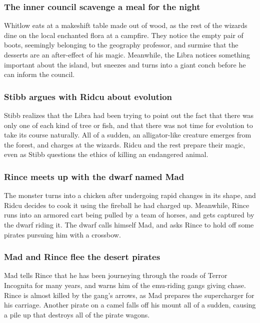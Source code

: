 \subsubsection{The inner council scavenge a meal for the night}
\Gls{Whitlow} eats at a makeshift table made out of wood, as the rest of the wizards dine on the
local enchanted flora at a campfire. They notice the empty pair of boots, seemingly belonging to
the geography professor, and surmise that the desserts are an after-effect of his magic. Meanwhile,
the \Gls{Libra} notices something important about the island, but sneezes and turns into a giant
conch before he can inform the council.

\subsubsection{\Gls{Stibb} argues with \Gls{Ridcu} about evolution}
\Gls{Stibb} realizes that the \Gls{Libra} had been trying to point out the fact that there was
only one of each kind of tree or fish, and that there was not time for evolution to take its course
naturally. All of a sudden, an alligator-like creature emerges from the forest, and charges at the
wizards. \Gls{Ridcu} and the rest prepare their magic, even as \Gls{Stibb} questions the ethics of
killing an endangered animal.

\subsubsection{\Gls{Rince} meets up with the dwarf named \Gls{Mad}}
The monster turns into a chicken after undergoing rapid changes in its shape, and \Gls{Ridcu}
decides to cook it using the fireball he had charged up. Meanwhile, \Gls{Rince} runs into an armored
cart being pulled by a team of horses, and gets captured by the dwarf riding it. The dwarf calls
himself \Gls{Mad}, and asks \Gls{Rince} to hold off some pirates pursuing him with a crossbow.

\subsubsection{\Gls{Mad} and \Gls{Rince} flee the desert pirates}
\Gls{Mad} tells \Gls{Rince} that he has been journeying through the roads of Terror Incognita for
many years, and warns him of the emu-riding gangs giving chase. \Gls{Rince} is almost killed by
the gang's arrows, as \Gls{Mad} prepares the supercharger for his carriage. Another pirate on a
camel falls off his mount all of a sudden, causing a pile up that destroys all of the pirate wagons.

